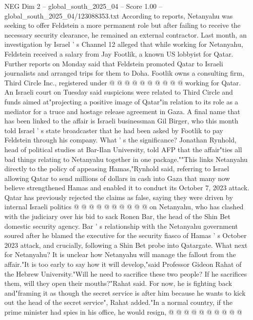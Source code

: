 \begin{textsample}{NEG Dim 2 – global\_south\_2025\_04 – Score 1.00 – global\_south\_2025\_04/123088353.txt}
According to reports, Netanyahu was seeking to offer Feldstein a more permanent role but after failing to receive the necessary security clearance, he remained an external contractor.
Last month, an investigation by Israel ' s Channel 12 alleged that while working for Netanyahu, Feldstein received a salary from Jay Footlik, a known US lobbyist for Qatar.
Further reports on Monday said that Feldstein promoted Qatar to Israeli journalists and arranged trips for them to Doha.
Footlik owns a consulting firm, Third Circle Inc., registered under @ @ @ @ @ @ @ @ @ @ working for Qatar.
An Israeli court on Tuesday said suspicions were related to Third Circle and funds aimed at"projecting a positive image of Qatar"in relation to its role as a mediator for a truce and hostage release agreement in Gaza.
A final name that has been linked to the affair is Israeli businessman Gil Birger, who this month told Israel ' s state broadcaster that he had been asked by Footlik to pay Feldstein through his company.
What ' s the significance?
Jonathan Rynhold, head of political studies at Bar-Ilan University, told AFP that the affair"ties all bad things relating to Netanyahu together in one package.""This links Netanyahu directly to the policy of appeasing Hamas,"Rynhold said, referring to Israel allowing Qatar to send millions of dollars in cash into Gaza that many now believe strengthened Hamas and enabled it to conduct its October 7, 2023 attack.
Qatar has previously rejected the claims as false, saying they were driven by internal Israeli politics @ @ @ @ @ @ @ @ @ @ on Netanyahu, who has clashed with the judiciary over his bid to sack Ronen Bar, the head of the Shin Bet domestic security agency.
Bar ' s relationship with the Netanyahu government soured after he blamed the executive for the security fiasco of Hamas ' s October 2023 attack, and crucially, following a Shin Bet probe into Qatargate.
What next for Netanyahu?
It is unclear how Netanyahu will manage the fallout from the affair."It is too early to say how it will develop,"said Professor Gideon Rahat of the Hebrew University."Will he need to sacrifice these two people?
If he sacrifices them, will they open their mouths?"Rahat said.
For now, he is fighting back and"framing it as though the secret service is after him because he wants to kick out the head of the secret service", Rahat added."In a normal country, if the prime minister had spies in his office, he would resign, @ @ @ @ @ @ @ @ @ @

\end{textsample}
